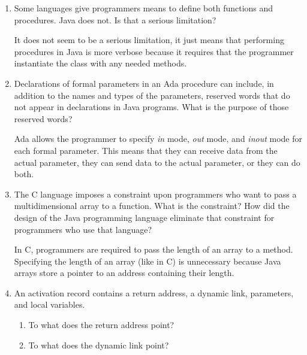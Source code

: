 \begin{enumerate}
  \item Some languages give programmers means to define
    both functions and procedures. Java does not. Is that
    a serious limitation?

  \begin{answer}

    It does not seem to be a serious limitation, it just means that performing procedures in Java is more verbose because it requires that the programmer instantiate the class with any needed methods.

  \end{answer}

  \item Declarations of formal parameters in an Ada procedure
    can include, in addition to the names and types of the
    parameters, reserved words that do not appear in declarations
    in Java programs. 
    What is the purpose of those reserved words?

  \begin{answer}

  	Ada allows the programmer to specify \textit{in} mode, \textit{out} mode, and \textit{inout} mode for each formal parameter.  This means that they can receive data from the actual parameter, they can send data to the actual parameter, or they can do both.

  \end{answer}
 
  \item The C language imposes a constraint upon programmers
    who want to pass a multidimensional array to a function.
    What is the constraint? How did the design of the Java
    programming language eliminate that constraint for 
    programmers who use that language?

  \begin{answer}

    In C, programmers are required to pass the length of an array to a method. Specifying the length of an array (like in C) is unnecessary because Java arrays store a pointer to an address containing their length.

  \end{answer}

  \item An activation record contains a return
    address, a dynamic link, parameters, and
    local variables.
  \begin{enumerate}
    \item To what does the return address point?
    \item To what does the dynamic link point?
    \end{enumerate}


\end{enumerate}
